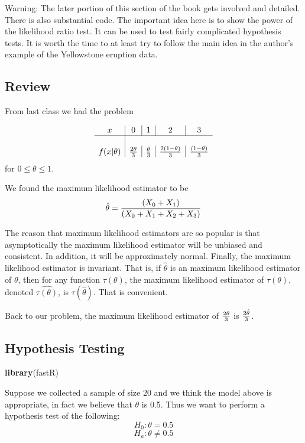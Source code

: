 \documentclass[]{book}
\newenvironment{Shaded}{\begin{snugshade}}{\end{snugshade}}
\newcommand{\KeywordTok}[1]{\textcolor[rgb]{0.13,0.29,0.53}{\textbf{#1}}}
\newcommand{\NormalTok}[1]{#1}
\theoremstyle{definition}
\theoremstyle{definition}
\theoremstyle{definition}
\theoremstyle{remark}
\begin{document}
Warning: The later portion of this section of the book gets involved and
detailed. There is also substantial code. The important idea here is to
show the power of the likelihood ratio test. It can be used to test
fairly complicated hypothesis tests. It is worth the time to at least
try to follow the main idea in the author's example of the Yellowstone
eruption data.

\subsection{Review}\label{review-5}

From last class we had the problem

\[
\begin{array}{c|c|c|c|c} 
x & 0 & 1 & 2 & 3 \\ \hline \\ f(x|\theta) & {2 \theta \over 3} & {\theta \over 3} & {2 (1 - \theta) \over 3} & {(1- \theta) \over 3}
\end{array} 
\] for \(0 \leq \theta \leq 1\).

We found the maximum likelihood estimator to be
\[\hat{\theta}={ (X_{0}+X_{1}) \over (X_{0}+X_{1}+X_{2}+X_{3}) }\]

The reason that maximum likelihood estimators are so popular is that
asymptotically the maximum likelihood estimator will be unbiased and
consistent. In addition, it will be approximately normal. Finally, the
maximum likelihood estimator is invariant. That is, if \(\hat{\theta}\)
is an maximum likelihood estimator of \(\theta\), then for any function
\(\tau(\theta)\), the maximum likelihood estimator of \(\tau(\theta)\),
denoted \(\widehat{\tau(\theta)}\), is \(\tau(\hat{\theta})\). That is
convenient.

Back to our problem, the maximum likelihood estimator of
\({2 \theta \over 3}\) is \({2 \hat{\theta} \over 3}\).

\subsection{Hypothesis Testing}\label{hypothesis-testing}

\begin{Shaded}
\begin{Highlighting}[]
\KeywordTok{library}\NormalTok{(fastR)}
\end{Highlighting}
\end{Shaded}

Suppose we collected a sample of size 20 and we think the model above is
appropriate, in fact we believe that \(\theta\) is 0.5. Thus we want to
perform a hypothesis test of the following: \[H_{0}: \theta = 0.5\]
\[H_{a}: \theta \neq 0.5\]
\end{document}
